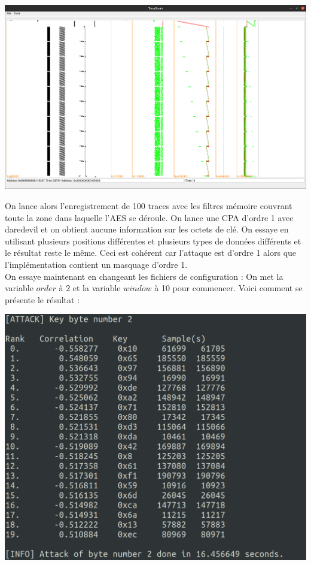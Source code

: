 \documentclass[10pt,a4paper]{article}
\begin{document}
\begin{center}
\includegraphics[scale=0.11]{Images/Rivain_Prouff_avec_filtre.png}\\
\end{center}
On lance alors l'enregistrement de 100 traces avec les filtres mémoire couvrant toute la zone dans laquelle l'AES se déroule. On lance une CPA d'ordre 1 avec daredevil et on obtient aucune information sur les octets de clé. On essaye en utilisant plusieurs positions différentes et plusieurs types de données différents et le résultat reste le même. Ceci est cohérent car l'attaque est d'ordre 1 alors que l'implémentation contient un masquage d'ordre 1.\\
On essaye maintenant en changeant les fichiers de configuration : On met la variable $order$ à 2 et la variable $window$ à 10 pour commencer. Voici comment se présente le résultat :

\begin{center}
\includegraphics[scale=0.30]{Images/Rivain_Prouff_ordre_2.png}\\
\end{center}
\end{document}
